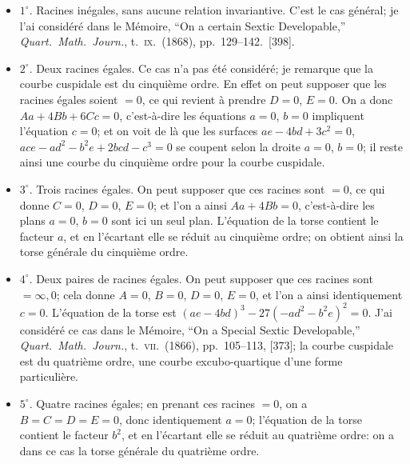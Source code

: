 \documentclass[11pt,a4paper]{article}
\begin{document}
\begin{itemize}[label={}]
\item $1^\circ$. Racines in\'egales, sans aucune relation invariantive. C'est le cas
g\'en\'eral; je l'ai consid\'er\'e dans le M\'emoire, ``On a certain Sextic Developable,''
\textit{Quart.\ Math.\ Journ.}, t.\ \textsc{ix}.\ (1868), pp.\ 129--142.\ [398].

\item $2^\circ$. Deux racines \'egales. Ce cas n'a pas \'et\'e consid\'er\'e; je remarque
que la courbe cuspidale est du cinqui\`eme ordre. En effet on peut supposer que les
racines \'egales soient $= 0$, ce qui revient \`a prendre $D = 0$, $E = 0$. On a donc
$Aa + 4Bb + 6Cc = 0$, c'est-\`a-dire les \'equations $a = 0$, $b = 0$ impliquent
l'\'equation $c = 0$; et on voit de l\`a que les surfaces $ae - 4bd + 3c^2 = 0$,
$ace - ad^2 - b^2 e + 2bcd - c^3 = 0$ se coupent selon la droite $a = 0$, $b = 0$; il
reste ainsi une courbe du cinqui\`eme ordre pour la courbe cuspidale.

\item $3^\circ$. Trois racines \'egales. On peut supposer que ces racines sont $= 0$, ce
qui donne $C = 0$, $D = 0$, $E = 0$; et l'on a ainsi $Aa + 4Bb = 0$, c'est-\`a-dire les
plans $a = 0$, $b = 0$ sont ici un seul plan. L'\'equation de la torse contient le
facteur $a$, et en l'\'ecartant elle se r\'eduit au cinqui\`eme ordre; on obtient ainsi
la torse g\'en\'erale du cinqui\`eme ordre.

\item $4^\circ$. Deux paires de racines \'egales. On peut supposer que ces racines sont
$= \infty, 0$; cela donne $A = 0$, $B = 0$, $D = 0$, $E = 0$, et l'on a ainsi
identiquement $c = 0$. L'\'equation de la torse est $(ae - 4bd)^3 - 27 (-ad^2 - b^2 e)^2 = 0$.
J'ai consid\'er\'e ce cas dans le M\'emoire, ``On a Special Sextic Developable,''
\textit{Quart.\ Math.\ Journ.}, t.\ \textsc{vii}.\ (1866), pp.\ 105--113, [373]; la courbe
cuspidale est du quatri\`eme ordre, une courbe excubo-quartique d'une forme particuli\`ere.

\item $5^\circ$. Quatre racines \'egales; en prenant ces racines $= 0$, on a
$B = C = D = E = 0$, donc identiquement $a = 0$; l'\'equation de la torse contient le
facteur $b^2$, et en l'\'ecartant elle se r\'eduit au quatri\`eme ordre: on a dans ce cas
la torse g\'en\'erale du quatri\`eme ordre.

\end{itemize}
\end{document}
